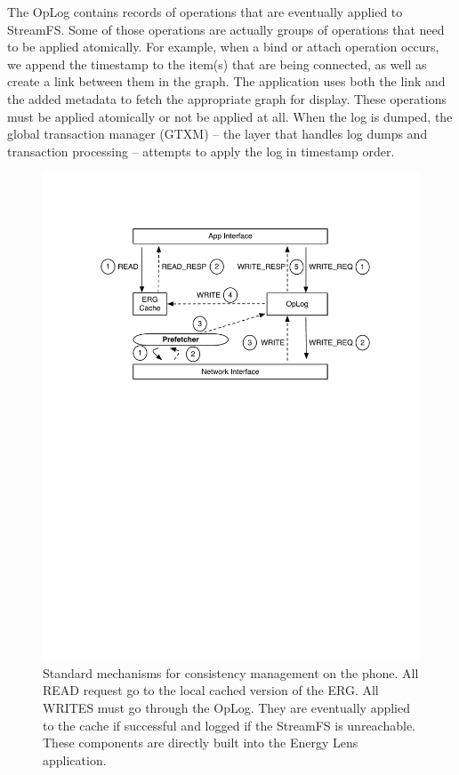 The OpLog contains records of operations that are eventually applied to StreamFS.  Some of those operations
are actually groups of operations that need to be applied atomically.  For example, 
when a bind or attach operation occurs, we append the timestamp to the item(s) that are being connected, as well as create
a link between them in the graph.  The application uses both the link and the added metadata to fetch the appropriate
graph for display.  These operations must be applied atomically or not be applied at all.
When the log is dumped, the global transaction manager (GTXM) -- the layer that handles log dumps and transaction processing --
attempts to apply the log in timestamp order.


\begin{figure}[htb!]
\begin{center}
\includegraphics[scale=0.80]{figs/standard_interaction}
\caption{Standard mechanisms for consistency management on the phone.  All READ request go to the local
cached version of the ERG.  All WRITES must go through the OpLog.
They are eventually applied to the cache
if successful and logged if the StreamFS is unreachable.  These components are directly built into the 
Energy Lens application.}
\label{fig:interactions}
\end{center}
\end{figure}

